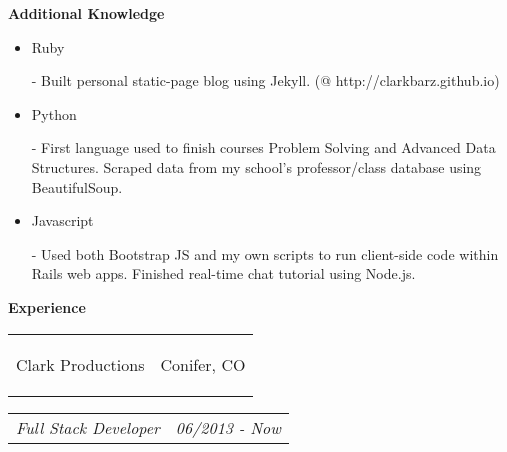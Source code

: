 \documentclass[11pt]{article}
\makeatletter
\newcommand{\headerrow}[2]
{\begin{tabular*}{\linewidth}{l@{\extracolsep{\fill}}r}
	#1 &
	#2 \\
\end{tabular*}}
\makeatother
\begin{document}
\begin{LARGE}
	\bf Additional Knowledge
\end{LARGE}

\vspace{-0.5em}

\begin{itemize}
	\item \begin{bf}Ruby\end{bf} - Built personal static-page blog using Jekyll. (@ http://clarkbarz.github.io)
	\vspace{-0.5em}
	\item \begin{bf}Python\end{bf} - First language used to finish courses Problem Solving and Advanced Data Structures. Scraped data from my school's professor/class database using BeautifulSoup.
	\vspace{-0.5em}
	\item \begin{bf}Javascript\end{bf} - Used both Bootstrap JS and my own scripts to run client-side code within Rails web apps. Finished real-time chat tutorial using Node.js.
\end{itemize}

\vspace{-0.5em}
\begin{LARGE}
	\bf Experience
\end{LARGE}

\vspace{0.5em}
\headerrow
	{\begin{Large}Clark Productions\end{Large}}
	{Conifer, CO}
\headerrow
	{\textit{Full Stack Developer}}
	{\textit{06/2013 - Now}}
\end{document}
